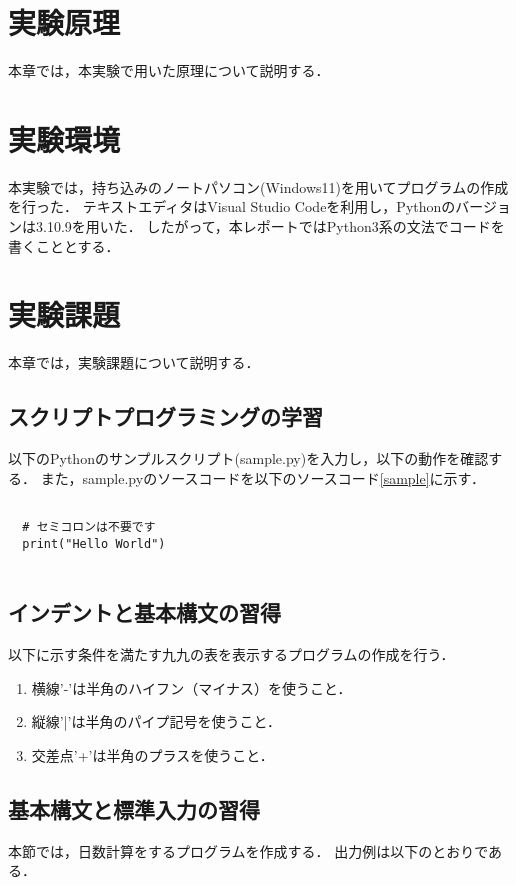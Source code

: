 \documentclass[uplatex,dvipdfmx,12pt]{jsarticle}
\begin{document}
\newpage
\section{実験原理}
本章では，本実験で用いた原理について説明する．

\newpage
\section{実験環境}
本実験では，持ち込みのノートパソコン(Windows11)を用いてプログラムの作成を行った．
テキストエディタはVisual Studio Codeを利用し，Pythonのバージョンは3.10.9を用いた．
したがって，本レポートではPython3系の文法でコードを書くこととする．

\newpage
\section{実験課題}\label{sec:kadai}
本章では，実験課題について説明する．
\subsection{スクリプトプログラミングの学習}
以下のPythonのサンプルスクリプト(sample.py)を入力し，以下の動作を確認する．
また，sample.pyのソースコードを以下のソースコード\ref{sample}に示す．

\begin{lstlisting}[caption=sample.py, label=sample]

  # セミコロンは不要です
  print("Hello World")
  
\end{lstlisting}
\subsection{インデントと基本構文の習得}
以下に示す条件を満たす九九の表を表示するプログラムの作成を行う．
\begin{enumerate}
  \item 横線'-'は半角のハイフン（マイナス）を使うこと．
  \item 縦線'|'は半角のパイプ記号を使うこと．
  \item 交差点'+'は半角のプラスを使うこと．
\end{enumerate}



\subsection{基本構文と標準入力の習得}
本節では，日数計算をするプログラムを作成する．
出力例は以下のとおりである．
\end{document}
